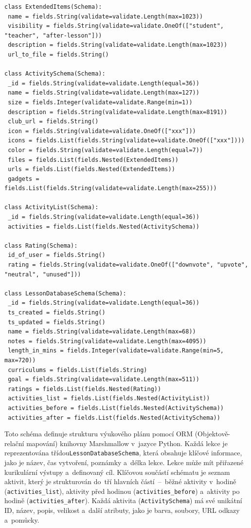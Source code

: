 \documentclass[male,czech,api_bc]{kitheses}
\begin{document}
\begin{lstlisting}
class ExtendedItems(Schema):
 name = fields.String(validate=validate.Length(max=1023))
 visibility = fields.String(validate=validate.OneOf(["student", "teacher", "after-lesson"]))
 description = fields.String(validate=validate.Length(max=1023))
 url_to_file = fields.String()

class ActivitySchema(Schema):
 _id = fields.String(validate=validate.Length(equal=36))
 name = fields.String(validate=validate.Length(max=127))
 size = fields.Integer(validate=validate.Range(min=1))
 description = fields.String(validate=validate.Length(max=8191))
 club_url = fields.String()
 icon = fields.String(validate=validate.OneOf(["xxx"]))
 icons = fields.List(fields.String(validate=validate.OneOf(["xxx"])))
 color = fields.String(validate=validate.Length(equal=7))
 files = fields.List(fields.Nested(ExtendedItems))
 urls = fields.List(fields.Nested(ExtendedItems))
 gadgets = fields.List(fields.String(validate=validate.Length(max=255)))
	
class ActivityList(Schema):
 _id = fields.String(validate=validate.Length(equal=36))
 activities = fields.List(fields.Nested(ActivitySchema))
	
class Rating(Schema):
 id_of_user = fields.String()
 rating = fields.String(validate=validate.OneOf(["downvote", "upvote", "neutral", "unused"]))
	
class LessonDatabaseSchema(Schema):
 _id = fields.String(validate=validate.Length(equal=36))
 ts_created = fields.String()
 ts_updated = fields.String()
 name = fields.String(validate=validate.Length(max=68))
 notes = fields.String(validate=validate.Length(max=4095))
 length_in_mins = fields.Integer(validate=validate.Range(min=5, max=720))
 curriculums = fields.List(fields.String)
 goal = fields.String(validate=validate.Length(max=511))
 ratings = fields.List(fields.Nested(Rating))
 activities_list = fields.List(fields.Nested(ActivityList))
 activities_before = fields.List(fields.Nested(ActivitySchema))
 activities_after = fields.List(fields.Nested(ActivitySchema))
\end{lstlisting}

Toto schéma definuje strukturu výukového plánu pomocí ORM (Objektově-relační mapování) knihovny Marshmallow v~jazyce Python. Každá lekce je reprezentována třídou\break\texttt{LessonDatabaseSchema}, která obsahuje klíčové informace, jako je název, čas vytvoření, poznámky a~délka lekce. Lekce může mít přiřazené kurikulární výstupy a~definovaný cíl. Klíčovou součástí schématu je seznam aktivit, který je strukturován do~tří hlavních částí~--~běžné aktivity v~hodině (\texttt{activities\_list}), aktivity před hodinou (\texttt{activities\_before}) a~aktivity po hodině (\texttt{activities\_after}). Každá aktivita (\texttt{ActivitySchema}) má své unikátní ID, název, popis, velikost a~další atributy, jako je barva, soubory, URL odkazy a~pomůcky.
\end{document}
